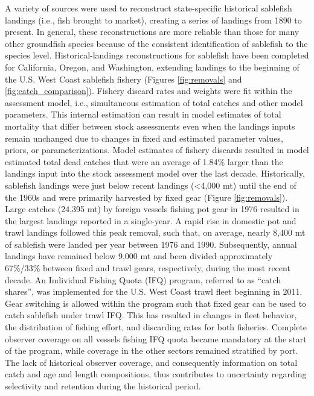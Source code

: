 \documentclass[11pt,
  english,
  a4paper,
]{article}
\begin{document}
A variety of sources were used to reconstruct state-specific historical sablefish landings (i.e., fish brought to market), creating a series of landings from 1890 to present. In general, these reconstructions are more reliable than those for many other groundfish species because of the consistent identification of sablefish to the species level. Historical-landings reconstructions for sablefish have been completed for California, Oregon, and Washington, extending landings to the beginning of the U.S. West Coast sablefish fishery (Figures \ref{fig:removals} and \ref{fig:catch_comparison}). Fishery discard rates and weights were fit within the assessment model, i.e., simultaneous estimation of total catches and other model parameters. This internal estimation can result in model estimates of total mortality that differ between stock assessments even when the landings inputs remain unchanged due to changes in fixed and estimated parameter values, priors, or parameterizations. Model estimates of fishery discards resulted in model estimated total dead catches that were an average of 1.84\% larger than the landings input into the stock assessment model over the last decade. Historically, sablefish landings were just below recent landings (\textless4,000 mt) until the end of the 1960s and were primarily harvested by fixed gear (Figure \ref{fig:removals}). Large catches (24,395 mt) by foreign vessels fishing pot gear in 1976 resulted in the largest landings reported in a single-year. A rapid rise in domestic pot and trawl landings followed this peak removal, such that, on average, nearly 8,400 mt of sablefish were landed per year between 1976 and 1990. Subsequently, annual landings have remained below 9,000 mt and been divided approximately 67\%/33\% between fixed and trawl gears, respectively, during the most recent decade. An Individual Fishing Quota (IFQ) program, referred to as ``catch shares'', was implemented for the U.S. West Coast trawl fleet beginning in 2011. Gear switching is allowed within the program such that fixed gear can be used to catch sablefish under trawl IFQ. This has resulted in changes in fleet behavior, the distribution of fishing effort, and discarding rates for both fisheries. Complete observer coverage on all vessels fishing IFQ quota became mandatory at the start of the program, while coverage in the other sectors remained stratified by port. The lack of historical observer coverage, and consequently information on total catch and age and length compositions, thus contributes to uncertainty regarding selectivity and retention during the historical period.
\end{document}
